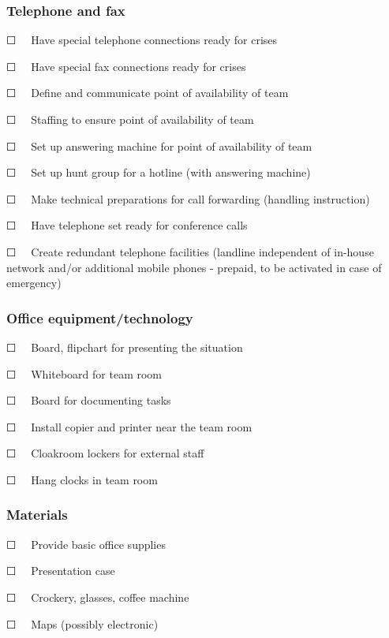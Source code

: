 \documentclass{article}
\begin{document}
\subsubsection{Telephone and fax}\label{H9723828}



☐   Have special telephone connections ready for crises


☐   Have special fax connections ready for crises


☐   Define and communicate point of availability of team


☐   Staffing to ensure point of availability of team 


☐   Set up answering machine for point of availability of team


☐   Set up hunt group for a hotline (with answering machine)


☐   Make technical preparations for call forwarding (handling instruction)


☐   Have telephone set ready for conference calls


☐   Create redundant telephone facilities (landline independent of in-house network and/or additional mobile phones - prepaid, to be activated in case of emergency) 


\subsubsection{Office equipment/technology}\label{H4829806}



☐   Board, flipchart for presenting the situation


☐   Whiteboard for team room


☐   Board for documenting tasks


☐   Install copier and printer near the team room


☐   Cloakroom lockers for external staff


☐   Hang clocks in team room


\subsubsection{Materials}\label{H3998633}



☐   Provide basic office supplies


☐   Presentation case


☐   Crockery, glasses, coffee machine


☐   Maps (possibly electronic)
\end{document}
